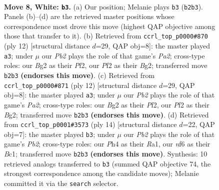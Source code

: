 \documentclass[11pt]{article}
\begin{document}
\begin{figure}[p]\centering
\begin{subfigure}{0.46\textwidth}\centering
\resizebox{\linewidth}{!}{%
\newchessgame
\chessboard[
  setfen={r1bq1rk1/pp1pppb1/2n2np1/2p4p/2P4P/2N2NP1/PP1PPPB1/R1BQ1RK1 w - - 0 8},
  showmover=false,
  pgfstyle=straightmove, color=movearrow, markmove={b2-b3}
]}
\caption{}
\end{subfigure}\hfill
\begin{subfigure}{0.46\textwidth}\centering
\resizebox{\linewidth}{!}{%
\newchessgame
\chessboard[
  setfen={r1bqk2r/pp2ppbp/2np1np1/2p5/2P5/2N2NP1/PP1PPPBP/R1BQ1RK1 w kq - 0 7},
  showmover=false,
  pgfstyle=straightmove, color=movearrow, markmove={a2-a3}
]}
\caption{}
\end{subfigure}
\\[4pt]
\begin{subfigure}{0.46\textwidth}\centering
\resizebox{\linewidth}{!}{%
\newchessgame
\chessboard[
  setfen={r1bqk2r/pp2ppbp/2np1np1/2p5/2P5/2N2NP1/PP1PPPBP/R1BQ1RK1 w kq - 0 7},
  showmover=false,
  pgfstyle=straightmove, color=movearrow, markmove={a2-a3}
]}
\caption{}
\end{subfigure}\hfill
\begin{subfigure}{0.46\textwidth}\centering
\resizebox{\linewidth}{!}{%
\newchessgame
\chessboard[
  setfen={r1bq1rk1/ppp1p1bp/2np1np1/5p2/2PP4/2N2NP1/PP2PPBP/R1BQ1RK1 w - - 2 8},
  showmover=false,
  pgfstyle=straightmove, color=movearrow, markmove={b2-b3}
]}
\caption{}
\end{subfigure}
\caption{\textbf{Move 8, White: \texttt{b3}.} (a) Our position; Melanie plays \texttt{b3} (\texttt{b2b3}). Panels (b)--(d) are the retrieved master positions whose correspondence most drove this move (highest QAP objective among those that transfer to it). (b) Retrieved from \texttt{ccrl\_top\_p0000\#870} (ply 12) [structural distance $d$=29, QAP obj=8]: the master played \texttt{a3}; under $\mu$ our \emph{Pb2} plays the role of that game's \emph{Pa2}; cross-type roles: our \emph{B}g2 as their \emph{P}f2, our \emph{P}f2 as their \emph{B}g2; transferred move \texttt{b2b3} \textbf{(endorses this move)}. (c) Retrieved from \texttt{ccrl\_top\_p0000\#871} (ply 12) [structural distance $d$=29, QAP obj=8]: the master played \texttt{a3}; under $\mu$ our \emph{Pb2} plays the role of that game's \emph{Pa2}; cross-type roles: our \emph{B}g2 as their \emph{P}f2, our \emph{P}f2 as their \emph{B}g2; transferred move \texttt{b2b3} \textbf{(endorses this move)}. (d) Retrieved from \texttt{ccrl\_top\_p0001\#3573} (ply 14) [structural distance $d$=22, QAP obj=7]: the master played \texttt{b3}; under $\mu$ our \emph{Pb2} plays the role of that game's \emph{Pb2}; cross-type roles: our \emph{P}h4 as their \emph{R}a1, our \emph{n}f6 as their \emph{B}c1; transferred move \texttt{b2b3} \textbf{(endorses this move)}. Synthesis: 10 retrieved analogs transferred to \texttt{b3} (summed QAP objective 74, the strongest correspondence among the candidate moves); Melanie committed it via the \texttt{search} selector.}
\label{fig:thought-m14}
\end{figure}
\end{document}
